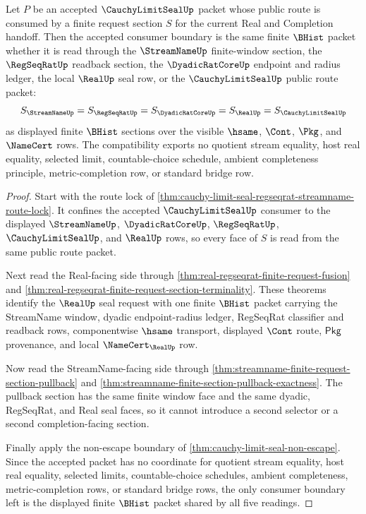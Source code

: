 \begin{theorem}
\label{thm:cauchy-limit-seal-finite-request-section-compatibility}
Let $P$ be an accepted $\CauchyLimitSealUp$ packet whose public route is consumed by a finite request section $S$ for the current Real and Completion handoff. Then the accepted consumer boundary is the same finite $\BHist$ packet whether it is read through the $\StreamNameUp$ finite-window section, the $\RegSeqRatUp$ readback section, the $\DyadicRatCoreUp$ endpoint and radius ledger, the local $\RealUp$ seal row, or the $\CauchyLimitSealUp$ public route packet:
$$
S_{\StreamNameUp}=S_{\RegSeqRatUp}=S_{\DyadicRatCoreUp}=S_{\RealUp}=S_{\CauchyLimitSealUp}
$$
as displayed finite $\BHist$ sections over the visible $\hsame$, $\Cont$, $\Pkg$, and $\NameCert$ rows. The compatibility exports no quotient stream equality, host real equality, selected limit, countable-choice schedule, ambient completeness principle, metric-completion row, or standard bridge row.
\end{theorem}
\begin{proof}
Start with the route lock of \autoref{thm:cauchy-limit-seal-regseqrat-streamname-route-lock}. It confines the accepted $\CauchyLimitSealUp$ consumer to the displayed $\StreamNameUp$, $\DyadicRatCoreUp$, $\RegSeqRatUp$, $\CauchyLimitSealUp$, and $\RealUp$ rows, so every face of $S$ is read from the same public route packet.

Next read the Real-facing side through \autoref{thm:real-regseqrat-finite-request-fusion} and \autoref{thm:real-regseqrat-finite-request-section-terminality}. These theorems identify the $\RealUp$ seal request with one finite $\BHist$ packet carrying the StreamName window, dyadic endpoint-radius ledger, RegSeqRat classifier and readback rows, componentwise $\hsame$ transport, displayed $\Cont$ route, $\mathsf{Pkg}$ provenance, and local $\NameCert_{\RealUp}$ row.

Now read the StreamName-facing side through \autoref{thm:streamname-finite-request-section-pullback} and \autoref{thm:streamname-finite-section-pullback-exactness}. The pullback section has the same finite window face and the same dyadic, RegSeqRat, and Real seal faces, so it cannot introduce a second selector or a second completion-facing section.

Finally apply the non-escape boundary of \autoref{thm:cauchy-limit-seal-non-escape}. Since the accepted packet has no coordinate for quotient stream equality, host real equality, selected limits, countable-choice schedules, ambient completeness, metric-completion rows, or standard bridge rows, the only consumer boundary left is the displayed finite $\BHist$ packet shared by all five readings.
\end{proof}

